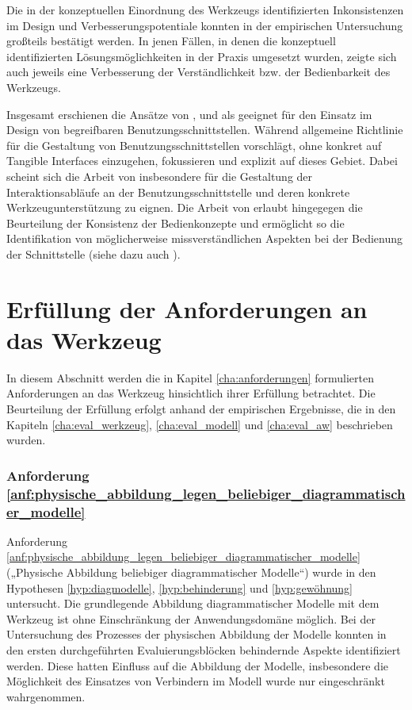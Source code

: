 Die in der konzeptuellen Einordnung des Werkzeugs identifizierten Inkonsistenzen im Design und Verbesserungspotentiale konnten in der empirischen Untersuchung großteils bestätigt werden. In jenen Fällen, in denen die konzeptuell identifizierten Lösungsmöglichkeiten in der Praxis umgesetzt wurden, zeigte sich auch jeweils eine Verbesserung der Verständlichkeit bzw. der Bedienbarkeit des Werkzeugs.

Insgesamt erschienen die Ansätze von \citet{Bellotti02}, \citet{Shaer04} und \citet{Fishkin04} als geeignet für den Einsatz im Design von begreifbaren Benutzungsschnittstellen. Während \citet{Bellotti02} allgemeine Richtlinie für die Gestaltung von Benutzungsschnittstellen vorschlägt, ohne konkret auf Tangible Interfaces einzugehen, fokussieren \citet{Shaer04} und \citet{Fishkin04} explizit auf dieses Gebiet. Dabei scheint  sich die Arbeit von \citet{Shaer04} insbesondere für die Gestaltung der Interaktionsabläufe an der Benutzungsschnittstelle und deren konkrete Werkzeugunterstützung zu eignen. Die Arbeit von \citet{Fishkin04} erlaubt hingegegen die Beurteilung der Konsistenz der Bedienkonzepte und ermöglicht so die Identifikation von möglicherweise missverständlichen Aspekten bei der Bedienung der Schnittstelle (siehe dazu auch \citep{Oppl09d}).


\section{Erfüllung der Anforderungen an das Werkzeug}
\label{sec:erfüllung_der_anforderungen_an_das_werkzeug}

In diesem Abschnitt werden die in Kapitel \ref{cha:anforderungen} formulierten Anforderungen an das Werkzeug hinsichtlich ihrer Erfüllung betrachtet. Die Beurteilung der Erfüllung erfolgt anhand der empirischen Ergebnisse, die in den Kapiteln \ref{cha:eval_werkzeug}, \ref{cha:eval_modell} und \ref{cha:eval_aw} beschrieben wurden.

\subsubsection{Anforderung \ref{anf:physische_abbildung_legen_beliebiger_diagrammatischer_modelle}}
Anforderung \ref{anf:physische_abbildung_legen_beliebiger_diagrammatischer_modelle} („Physische Abbildung beliebiger diagrammatischer Modelle“) wurde in den Hypothesen \ref{hyp:diagmodelle}, \ref{hyp:behinderung} und \ref{hyp:gewöhnung} untersucht. Die grundlegende Abbildung diagrammatischer Modelle mit dem Werkzeug ist ohne Einschränkung der Anwendungsdomäne möglich. Bei der Untersuchung des Prozesses der physischen Abbildung der Modelle konnten in den ersten durchgeführten Evaluierungsblöcken behindernde Aspekte identifiziert werden. Diese hatten Einfluss auf die Abbildung der Modelle, insbesondere die Möglichkeit des Einsatzes von Verbindern im Modell wurde nur eingeschränkt wahrgenommen. 

